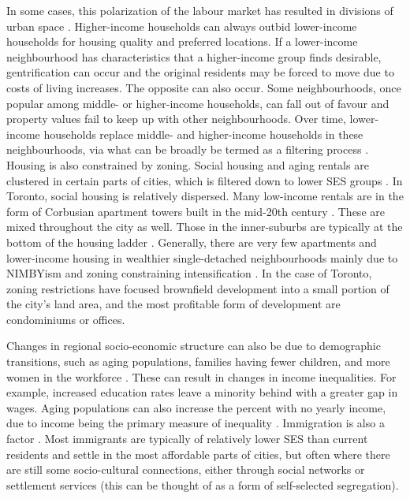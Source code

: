 In some cases, this polarization of the labour market has resulted in divisions of urban space \cite{walks_social_2001, walks_income_2013}. Higher-income households can always outbid lower-income households for housing quality and preferred locations. If a lower-income neighbourhood has characteristics that a higher-income group finds desirable, gentrification can occur and the original residents may be forced to move due to costs of living increases. The opposite can also occur. Some neighbourhoods, once popular among middle- or higher-income households, can fall out of favour and property values fail to keep up with other neighbourhoods. Over time, lower-income households replace middle- and higher-income households in these neighbourhoods, via what can be broadly be termed as a filtering process \cite{hulchanski_three_2010,ades_are_2012}. Housing is also constrained by zoning. Social housing and aging rentals are clustered in certain parts of cities, which is filtered down to lower SES groups \cite{hulchanski_three_2010}. In Toronto, social housing is relatively dispersed. Many low-income rentals are in the form of Corbusian apartment towers built in the mid-20th century \cite{august_gentrification_2018}. These are mixed throughout the city as well. Those in the inner-suburbs are typically at the bottom of the housing ladder \cite{hulchanski_three_2010,ehrenhalt_great_2012}. Generally, there are very few apartments and lower-income housing in wealthier single-detached neighbourhoods mainly due to NIMBYism and zoning constraining intensification \cite{scally_democracy_2015}. In the case of Toronto, zoning restrictions have focused brownfield development into a small portion of the city's land area, and the most profitable form of development are condominiums or offices. 

Changes in regional socio-economic structure can also be due to demographic transitions, such as aging populations, families having fewer children, and more women in the workforce \cite{bourne_changing_2001,bourne_are_1989}. These can result in changes in income inequalities. For example, increased education rates leave a minority behind with a greater gap in wages. Aging populations can also increase the percent with no yearly income, due to income being the primary measure of inequality \cite{bolton_growing_2012}. Immigration is also a factor \cite{bourne_changing_2001}. Most immigrants are typically of relatively lower SES than current residents and settle in the most affordable parts of cities, but often where there are still some socio-cultural connections, either through social networks or settlement services (this can be thought of as a form of self-selected segregation). 

